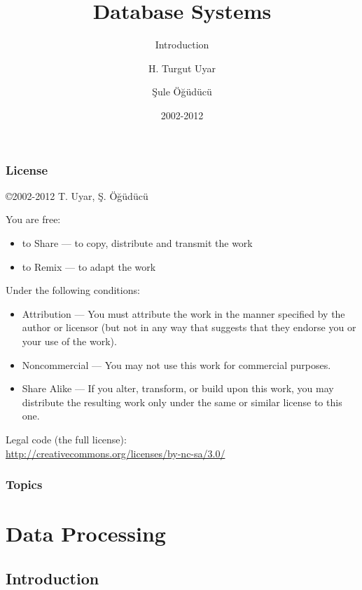 \documentclass[dvipsnames]{beamer}
\title{Database Systems}
\subtitle{Introduction}
\author{H. Turgut Uyar \and Şule Öğüdücü}
\date{2002-2012}
\theoremstyle{plain}
\begin{document}
\begin{frame}
  \titlepage
\end{frame}

\begin{frame}
  \frametitle{License}

  \hfill
  \copyright 2002-2012 T. Uyar, Ş. Öğüdücü

  \vfill
  \begin{tiny}
    You are free:
    \begin{itemize}
      \item to Share — to copy, distribute and transmit the work
      \item to Remix — to adapt the work
    \end{itemize}

    Under the following conditions:
    \begin{itemize}
      \item Attribution — You must attribute the work in the manner specified by
        the author or licensor (but not in any way that suggests that they
        endorse you or your use of the work).

      \item Noncommercial — You may not use this work for commercial purposes.

      \item Share Alike — If you alter, transform, or build upon this work, you
        may distribute the resulting work only under the same or similar license
        to this one.
    \end{itemize}
  \end{tiny}

  \vfill
  Legal code (the full license):\\
  \url{http://creativecommons.org/licenses/by-nc-sa/3.0/}
\end{frame}

\begin{frame}
  \frametitle{Topics}
  \tableofcontents
\end{frame}

\section{Data Processing}

\subsection{Introduction}
\end{document}
